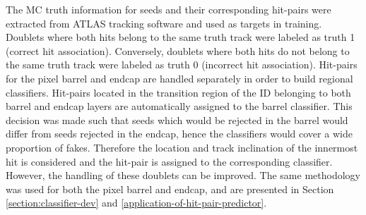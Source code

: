 The MC truth information for seeds and their corresponding hit-pairs were extracted from ATLAS tracking software and used as targets in training. Doublets where both hits belong to the same truth track were labeled as truth 1 (correct hit association). Conversely, doublets where both hits do not belong to the same truth track were labeled as truth 0 (incorrect hit association). Hit-pairs for the pixel barrel and endcap are handled separately in order to build regional classifiers. Hit-pairs located in the transition region of the ID belonging to both barrel and endcap layers are automatically assigned to the barrel classifier. This decision was made such that seeds which would be rejected in the barrel would differ from seeds rejected in the endcap, hence the classifiers would cover a wide proportion of fakes. Therefore the location and track inclination of the innermost hit is considered and the hit-pair is assigned to the corresponding classifier. However, the handling of these doublets can be improved. The same methodology was used for both the pixel barrel and endcap, and are presented in Section \ref{section:classifier-dev} and \ref{application-of-hit-pair-predictor}.





